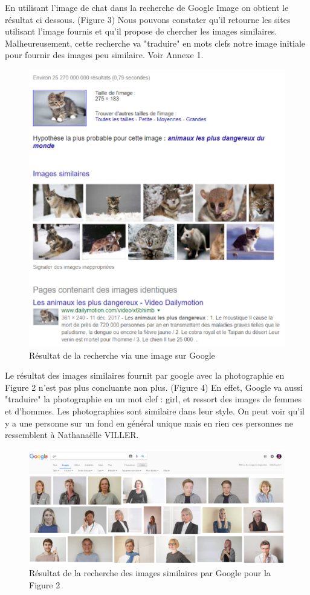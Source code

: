 \documentclass[a4paper,12pt]{article}
\begin{document}
En utilisant l'image de chat dans la recherche de Google Image on obtient le résultat ci dessous. (Figure 3) Nous pouvons constater qu'il retourne les sites utilisant l'image fournis et qu'il propose de chercher les images similaires.  Malheureusement, cette recherche va "traduire" en mots clefs notre image initiale pour fournir des images peu similaire. Voir Annexe 1. 

    \begin{figure}[!ht]
    \centering
        \includegraphics[scale=1]{images/ResGI.PNG}
        \caption{Résultat de la recherche via une image sur Google}
    \end{figure}

Le résultat des images similaires fournit par google avec la photographie en Figure 2 n'est pas plus concluante non plus. (Figure 4) En effet, Google va aussi "traduire" la photographie en un mot clef : girl, et ressort des images de femmes et d'hommes. Les photographies sont similaire dans leur style. On peut voir qu'il y a une personne sur un fond en général unique mais en rien ces personnes ne ressemblent à Nathanaëlle VILLER. 
    \begin{figure}[!ht]
    \centering
        \includegraphics[scale=0.7]{images/Res3GI.PNG}
        \caption{Résultat de la recherche des images similaires par Google pour la Figure 2}
    \end{figure}
    
\end{document}
